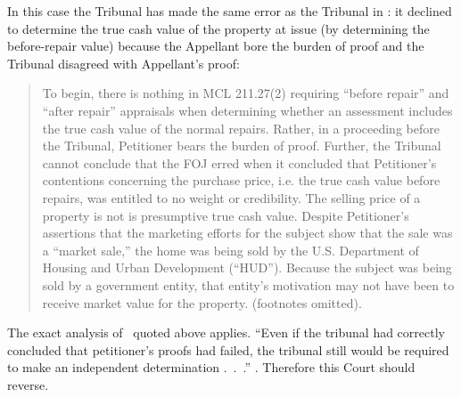 \documentclass[12pt,\documentclassflag]{michiganCourtOfAppealsBrief}
\begin{document}
In this case the Tribunal has made the same error as the Tribunal in \cite[s]{Jones & Laughlin}: it declined to determine the true cash value of the property at issue (by determining the before-repair value) because the Appellant bore the burden of proof and the Tribunal disagreed with Appellant's proof:

\begin{quote}
To begin, there is nothing in MCL 211.27(2) requiring ``before repair'' and ``after repair'' appraisals when determining whether an assessment includes the true cash value of the normal repairs. Rather, in a proceeding before the Tribunal, Petitioner bears the burden of proof. Further, the Tribunal cannot conclude that the FOJ erred when it concluded that Petitioner's contentions concerning the purchase price, i.e. the true cash value before repairs, was entitled to no weight or credibility. The selling price of a property is not is presumptive true cash value. Despite Petitioner's assertions that the marketing efforts for the subject show that the sale was a ``market sale,'' the home was being sold by the U.S. Department of Housing and Urban Development (``HUD''). Because the subject was being sold by a government entity, that entity's motivation may not have been to receive market value for the property.
\reconsiderationDenied[2] (footnotes omitted).
\end{quote}

The exact analysis of \cite[s]{Jones & Laughlin}\ quoted above applies. ``Even if the tribunal had correctly concluded that petitioner's proofs had failed, the tribunal still would be required to make an independent determination .~.~.'' . Therefore this Court should reverse.





\end{document}
